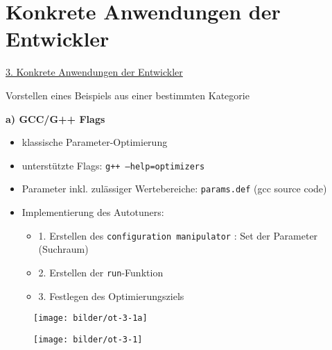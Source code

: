     \section{Konkrete Anwendungen der Entwickler}
    
    \begin{frame}
    \underline{3. Konkrete Anwendungen der Entwickler} \newline
    
     Vorstellen eines Beispiels aus einer bestimmten Kategorie \newline
    
    \textbf{a) GCC/G++ Flags}
      \begin{itemize}
        \item klassische Parameter-Optimierung
        \item unterstützte Flags: \texttt{g++ --help=optimizers}
        \item Parameter inkl. zulässiger Wertebereiche: \texttt{params.def} (gcc source code)
        \item Implementierung des Autotuners:
        \begin{itemize}
          \item 1. Erstellen des \texttt{configuration manipulator} : Set der Parameter (Suchraum)
          \item 2. Erstellen der \texttt{run}-Funktion
          \item 3. Festlegen des Optimierungsziels
        \end{itemize}
      \end{itemize}
    \end{frame}
        
  \begin{frame}
    \begin{figure}[ht]
      \centering	      
      \texttt{[image: bilder/ot-3-1a]}
      \label{gccpy1a}
    \end{figure}
  \end{frame}
  
  
  \begin{frame}
    \begin{figure}[ht]
      \centering	      
      \texttt{[image: bilder/ot-3-1]}
      \label{gccpy1}
    \end{figure}
  \end{frame}
  
